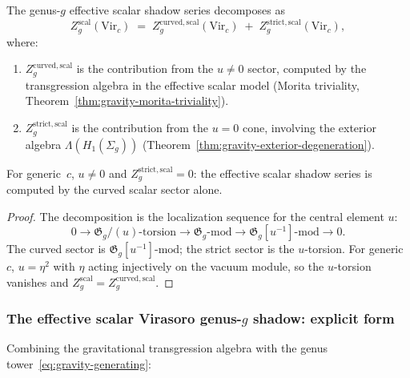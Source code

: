 \begin{proposition}
\label{prop:gravity-u-eigenvalue}
The genus-$g$ effective scalar shadow series decomposes as
\begin{equation}\label{eq:gravity-u-decomposition}
Z_g^{\mathrm{scal}}(\mathrm{Vir}_c)
\;=\;
Z_g^{\mathrm{curved,scal}}(\mathrm{Vir}_c)
\;+\;
Z_g^{\mathrm{strict,scal}}(\mathrm{Vir}_c),
\end{equation}
where:
\begin{enumerate}[label=\textup{(\roman*)}]
\item $Z_g^{\mathrm{curved,scal}}$ is the contribution from the
 $u \ne 0$ sector, computed by the transgression algebra
 in the effective scalar model
 \textup{(}Morita triviality,
 Theorem~\textup{\ref{thm:gravity-morita-triviality}}\textup{)}.
\item $Z_g^{\mathrm{strict,scal}}$ is the contribution from the
 $u = 0$ cone, involving the exterior algebra
 $\Lambda(H_1(\Sigma_g))$
 \textup{(}Theorem~\textup{\ref{thm:gravity-exterior-degeneration}}\textup{)}.
\end{enumerate}
For generic~$c$, $u \ne 0$ and
$Z_g^{\mathrm{strict,scal}} = 0$: the effective scalar shadow
series is computed by the curved scalar sector alone.
\end{proposition}

\begin{proof}
The decomposition is the localization sequence for the
central element $u$:
\[
0 \to \mathfrak{G}_g/(u)\text{-torsion}
\to \mathfrak{G}_g\text{-mod}
\to \mathfrak{G}_g[u^{-1}]\text{-mod} \to 0.
\]
The curved sector is $\mathfrak{G}_g[u^{-1}]\text{-mod}$;
the strict sector is the $u$-torsion. For generic~$c$,
$u = \eta^2$ with $\eta$ acting injectively on the vacuum module,
so the $u$-torsion vanishes and
$Z_g^{\mathrm{scal}} = Z_g^{\mathrm{curved,scal}}$.
\end{proof}

\subsubsection*{The effective scalar Virasoro genus-$g$ shadow: explicit form}

Combining the gravitational transgression algebra with the genus
tower~\eqref{eq:gravity-generating}:

